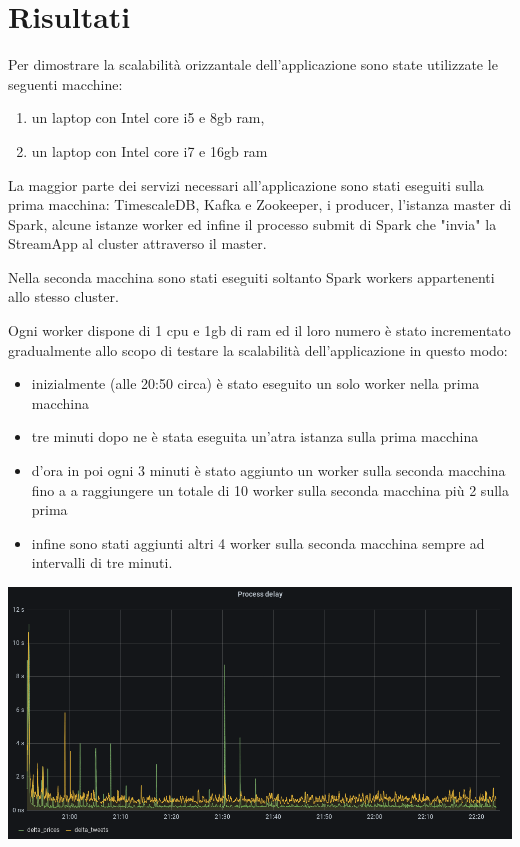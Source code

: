 \section{Risultati}

Per dimostrare la scalabilità orizzantale dell'applicazione sono state utilizzate le seguenti
macchine:

\begin{enumerate}
    \item un laptop con Intel core i5 e 8gb ram,
    \item un laptop con Intel core i7 e 16gb ram
\end{enumerate}

La maggior parte dei servizi necessari all'applicazione sono stati eseguiti sulla prima macchina:
TimescaleDB, Kafka e Zookeeper, i producer, l'istanza master di Spark, alcune istanze worker ed
infine il processo submit di Spark che "invia" la StreamApp al cluster attraverso il master.

Nella seconda macchina sono stati eseguiti soltanto Spark workers appartenenti allo stesso cluster.

Ogni worker dispone di 1 cpu e 1gb di ram ed il loro numero è stato incrementato gradualmente
allo scopo di testare la scalabilità dell'applicazione in questo modo:

\begin{itemize}
    \item inizialmente (alle 20:50 circa) è stato eseguito un solo worker nella prima macchina
    \item tre minuti dopo ne è stata eseguita un'atra istanza sulla prima macchina
    \item d'ora in poi ogni 3 minuti è stato aggiunto un worker sulla seconda macchina fino a
          a raggiungere un totale di 10 worker sulla seconda macchina più 2 sulla prima
    \item infine sono stati aggiunti altri 4 worker sulla seconda macchina sempre ad intervalli di
          tre minuti.
\end{itemize}

\begin{center}
    \includegraphics[max width=\linewidth]{process_delay.png}
    \label{processdelay}
\end{center}


